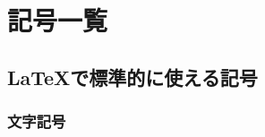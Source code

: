 \chapter{記号一覧}

\begin{abstract}
\LaTeX で使える記号一覧を紹介します．何らかのパッケージを必要とする
記号はプリアンブルで  命令を使って該当パッケージを
読み込みます．
\end{abstract}

\makeatletter
\renewenvironment{table}[1][htbp]%
   {\vskip 0pt plus 1pt minus 1pt
    \def\@captype{table}\vbox\bgroup}%
   {\egroup\vskip 0pt plus 1pt minus 1pt}
\makeatother


\section{\LaTeX で標準的に使える記号}


\subsection{文字記号}

